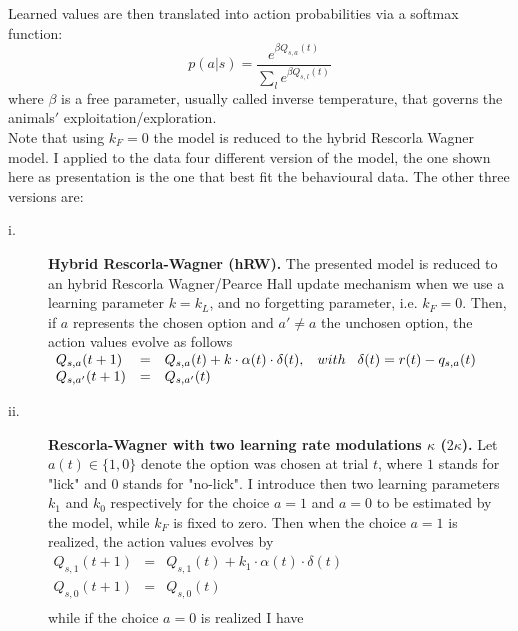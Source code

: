 Learned values are then translated into action probabilities via a softmax function:
\begin{equation}
p(a|s)=\frac{e^{\beta Q_{s,a}(t)}}{\sum_l e^{\beta Q_{s,l}(t)}}
\label{eq:ProbMod}
\end{equation}
where $\beta$ is a free parameter, usually called inverse temperature, that governs the animals$'$ exploitation/exploration.\\
Note that using $k_F = 0$ the model is reduced to the hybrid Rescorla Wagner model. I applied to the data four different version of the model, the one shown here as presentation is the one that best fit the behavioural data. The other three versions are:
\begin{description}
    \item[i.] \textbf{Hybrid Rescorla-Wagner (hRW).} The presented model is reduced to an hybrid Rescorla Wagner/Pearce Hall update mechanism when we use a learning parameter $k=k_L$, and no forgetting parameter, i.e. $k_F = 0$.
    Then, if $a$ represents the chosen option and $a'\neq a$ the unchosen option, the action values evolve as follows\\
    $\begin{array}{lcl}
    Q_{s,a}(t+1)&=& Q_{s,a}(t)+k\cdot\alpha(t)\cdot\delta(t), \hspace{0.3cm} with \hspace{0.3cm}\delta(t)=r(t)-q_{s,a}(t)\\
    Q_{s,a'}(t+1)&=&Q_{s,a'}(t)\\
    \end{array}$
    \item[ii.] \textbf{Rescorla-Wagner with two learning rate modulations $\kappa$ ($2\kappa$).} Let $a(t) \in \{1,0\}$ denote the option was chosen at trial $t$, where $1$ stands for "lick" and $0$ stands for "no-lick". I introduce then two learning parameters $k_{1}$ and $k_{0}$ respectively for the choice $a=1$ and $a=0$ to be estimated by the model, while $k_F$ is fixed to zero.
    Then when the choice $a=1$ is realized, the action values evolves by\\
   $\begin{array}{lcl}
       Q_{s,1}(t+1)&=&Q_{s,1}(t)+k_1\cdot\alpha(t)\cdot\delta(t)\\
         Q_{s,0}(t+1)&=&Q_{s,0}(t)\\ 
    \end{array}$\\
    while if the choice $a=0$ is realized I have\\

\end{description}
